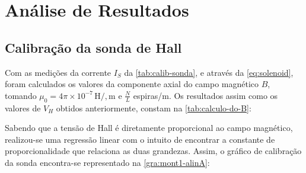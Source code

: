 


\section{Análise de Resultados}

\subsection{Calibração da sonda de Hall}


Com as medições da corrente $I_S$ da \cref{tab:calib-sonda}, e através da \cref{eq:solenoid}, foram calculados os valores da componente axial do campo magnético $B$, tomando $\mu_0 = 4\pi \times 10^{-7} \, \unit{\henry /, \meter}$ e $\frac{N}{L}$ espiras/m. Os resultados assim como os valores de $V_H$ obtidos anteriormente, constam na \cref{tab:calculo-do-B}:

\begin{table}[!ht]
	\centering
	\caption{Tensão de Hall, corrente no solenoide e campo magnético calculado.}
	\label{tab:calculo-do-B}
\end{table}

Sabendo que a tensão de Hall é diretamente proporcional ao campo magnético, realizou-se uma regressão linear com o intuito de encontrar a constante de proporcionalidade que relaciona as duas grandezas. Assim, o gráfico de calibração da sonda encontra-se representado na \cref{gra:mont1-alinA}:


